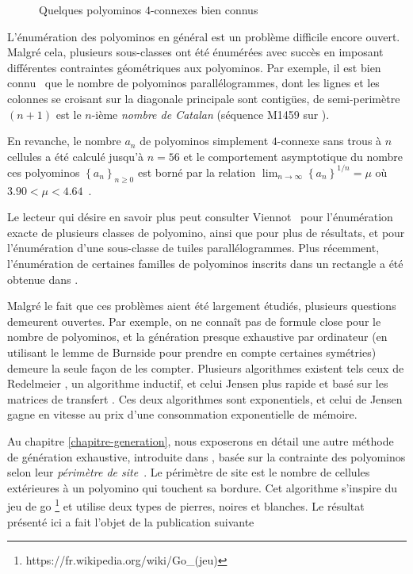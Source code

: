 \begin{introduction}
\begin{figure}[h]
\caption{Quelques polyominos $4$-connexes bien connus}
\end{figure}
\vspace{-1.6em}
L'énumération des polyominos en général est un problème difficile encore ouvert. Malgré cela, plusieurs sous-classes ont été énumérées avec succès en imposant différentes contraintes géométriques aux polyominos. Par exemple, il est bien connu~\cite{pol,stan} que le nombre de polyominos parallélogrammes, dont les lignes et les colonnes se croisant sur la diagonale principale sont contigües, de semi-perimètre $(n+1)$ est le $n$-ième {\em nombre de Catalan} (séquence M1459 sur \cite{OEIS}).

\vspace{-0.3em}
En revanche, le nombre $a_n$ de polyominos simplement $4$-connexe sans trous à $n$ cellules a été calculé jusqu'à $n=56$ \cite{Jen,oeisA001168} et le comportement asymptotique du nombre ces polyominos $\left\{a_n \right\}_{n \geq 0}$ est borné par la relation $\lim_{n\rightarrow \infty} \left\{a_n \right\}^{1/n}=\mu$ où \ $3.90 < \mu < 4.64$~\cite{JenGutt,KlarnerRivest}.

\vspace{-0.3em}
Le lecteur qui désire en savoir plus peut consulter Viennot~\cite{Vi} pour l'énumération exacte de plusieurs classes de polyomino, ainsi que \cite{MBM94,MBM96,MBM98} pour plus de résultats, et \cite{BFRV06} pour l'énumération d'une sous-classe de tuiles parallélogrammes. Plus récemment, l'énumération de certaines familles de polyominos inscrits dans un rectangle a été obtenue dans \cite{GCN10}.

\vspace{-0.3em}
Malgré le fait que ces problèmes aient été largement étudiés, plusieurs questions demeurent ouvertes. Par exemple, on ne connaît pas de formule close pour le nombre de polyominos, et la génération presque exhaustive par ordinateur (en utilisant le lemme de Burnside pour prendre en compte certaines symétries) demeure la seule façon de les compter. Plusieurs algorithmes existent tels ceux de Redelmeier \cite{Red}, un algorithme inductif, et celui Jensen \cite{Jen} plus rapide et basé sur les matrices de transfert \cite{stan}. Ces deux algorithmes sont exponentiels, et celui de Jensen gagne en vitesse au prix d'une consommation exponentielle de mémoire.

\vspace{-0.3em}
Au chapitre \ref{chapitre-generation}, nous exposerons en détail une autre méthode de génération exhaustive, introduite dans \cite{FGLT}, basée sur la contrainte des polyominos selon leur \emph{périmètre de site}~\cite{MBM03,Sieben08}. Le périmètre de site est le nombre de cellules extérieures à un polyomino qui touchent sa bordure. Cet algorithme s'inspire du jeu de go \footnote{https://fr.wikipedia.org/wiki/Go\_(jeu)} et utilise deux types de pierres, noires et blanches. Le résultat présenté ici a fait l'objet de la publication suivante


\end{introduction}
